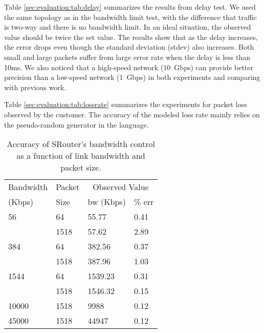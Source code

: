 \documentclass[conference]{IEEEtran}
\begin{document}
Table \ref{sec:evaluation:tab:delay} summarizes the results from delay
test.  We used the same topology as in the bandwidth limit test, with
the difference that traffic is two-way and there is no bandwidth
limit.
In an ideal situation, the observed value should be twice the set
value. The results show that as the delay increases, the error drops
even though the standard deviation (stdev) also increases. Both small
and large packets suffer from large error rate when the delay is less
than 10ms.
We also noticed that a high-speed network (10~Gbps) can provide better
precision than a low-speed network (1~Gbps) in both experiments and
comparing with previous work\cite{White:osdi02}.

Table \ref{sec:evaluation:tab:lossrate} summarizes the experiments for
packet loss observed by the customer. The accuracy of the modeled loss
rate mainly relies on the pseudo-random generator in the language.

\begin{table}[!tb]
  \caption{Accuracy of SRouter's bandwidth control as a function of link bandwidth and packet size.}
  \begin{tabular}{ | p{1.2cm} | p{1cm} || p{2.2cm} | p{2.2cm} | }
    \hline
    Bandwidth & Packet & \multicolumn{2}{c|}{Observed Value} \\
    (Kbps)    & Size   & bw (Kbps) & \% err \\
    \hline
    56 & 64 & 55.77 & 0.41 \\
    & 1518 & 57.62 & 2.89 \\
    \hline
    384 & 64 & 382.56 & 0.37 \\
    & 1518 & 387.96 & 1.03 \\
    \hline
    1544 & 64 & 1539.23 & 0.31 \\
    & 1518 & 1546.32 & 0.15 \\
    \hline
    10000 & 1518 & 9988 & 0.12 \\
    \hline
    45000 & 1518 & 44947 & 0.12 \\
    \hline
  \end{tabular}
  \label{sec:evaluation:tab:bandwidth}
  \vskip -5mm
\end{table}
\end{document}
